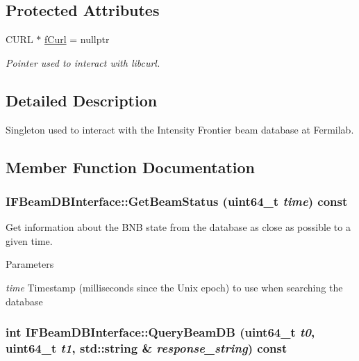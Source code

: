 \subsection*{Protected Attributes}
\begin{DoxyCompactItemize}
\item 
\hypertarget{classIFBeamDBInterface_a7dea07c539e0f0ca765f02d198345d2d}{
CURL $\ast$ \hyperlink{classIFBeamDBInterface_a7dea07c539e0f0ca765f02d198345d2d}{fCurl} = nullptr}
\label{classIFBeamDBInterface_a7dea07c539e0f0ca765f02d198345d2d}

\begin{DoxyCompactList}\small\item\em Pointer used to interact with libcurl. \item\end{DoxyCompactList}\end{DoxyCompactItemize}


\subsection{Detailed Description}
Singleton used to interact with the Intensity Frontier beam database at Fermilab. 

\subsection{Member Function Documentation}
\hypertarget{classIFBeamDBInterface_add525c53cbf0b85c3cd0d39a5b9b0fdd}{
\subsubsection[{GetBeamStatus}]{ IFBeamDBInterface::GetBeamStatus (uint64\_\-t {\em time}) const}}
\label{classIFBeamDBInterface_add525c53cbf0b85c3cd0d39a5b9b0fdd}


Get information about the BNB state from the database as close as possible to a given time. 
\begin{DoxyParams}{Parameters}
\item[{\em time}]Timestamp (milliseconds since the Unix epoch) to use when searching the database \end{DoxyParams}
\hypertarget{classIFBeamDBInterface_a034ef023cb78989270a4ec2d54a5aa4f}{
\subsubsection[{QueryBeamDB}]{\setlength{\rightskip}{0pt plus 5cm}int IFBeamDBInterface::QueryBeamDB (uint64\_\-t {\em t0}, \/  uint64\_\-t {\em t1}, \/  std::string \& {\em response\_\-string}) const}}
\label{classIFBeamDBInterface_a034ef023cb78989270a4ec2d54a5aa4f}


